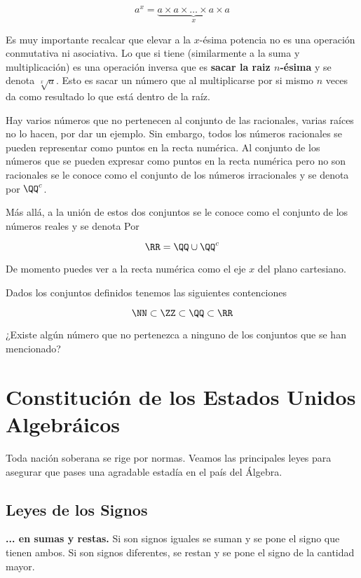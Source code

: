 \[a^x=\underbrace{a\times a\times \dots \times a \times a}_x\]

Es muy importante recalcar que elevar a la $x$-ésima potencia  
no es una operación conmutativa ni asociativa. 
Lo que si tiene (similarmente a la suma y multiplicación) es 
una operación inversa que es \textbf{sacar la raiz $n$-ésima} 
y se denota $\sqrt[x]{a}$. 
Esto es sacar un número que al multiplicarse por si mismo $n$ 
veces da como resultado lo que está dentro de la raíz. 

Hay varios números que no pertenecen al conjunto de las 
racionales, varias raíces no lo hacen, por dar un ejemplo. 
Sin embargo, todos los números racionales se pueden 
representar como puntos en la recta numérica. Al 
conjunto de los números que se pueden expresar como puntos en 
la recta numérica pero no son racionales se le conoce como el 
conjunto de los números irracionales y se denota por $\QQ^c$.

Más allá, a la unión de estos dos conjuntos se le conoce como 
el conjunto de los números reales y se denota Por

\[\RR = \QQ \cup \QQ^c\]

De momento puedes ver a la recta numérica como el eje $x$ del 
plano cartesiano.

Dados los conjuntos definidos tenemos las siguientes contenciones 

\[\NN \subset \ZZ \subset \QQ \subset \RR\]

\begin{question}
¿Existe algún número que no pertenezca a ninguno de los 
conjuntos que se han mencionado?
\end{question}

\section{Constitución de los Estados Unidos Algebráicos}

Toda nación soberana se rige por normas. Veamos las principales 
leyes para asegurar que pases una agradable estadía en el 
país del Álgebra.

\subsection{Leyes de los Signos}

\textbf{... en sumas y restas.} Si son signos iguales se suman 
y se pone el signo que tienen ambos. Si son signos diferentes, 
se restan y se pone el signo de la cantidad mayor.

